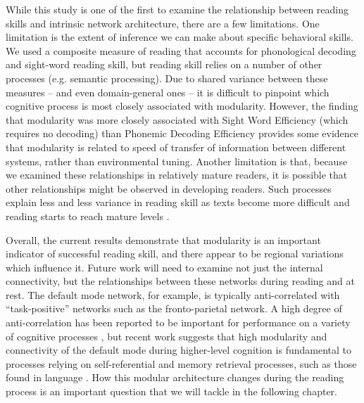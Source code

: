 While this study is one of the first to examine the relationship between reading skills and intrinsic network architecture, there are a few limitations. One limitation is the extent of inference we can make about specific behavioral skills. We used a composite measure of reading that accounts for phonological decoding and sight-word reading skill, but reading skill relies on a number of other processes (e.g. semantic processing). Due to shared variance between these measures -- and even domain-general ones -- it is difficult to pinpoint which cognitive process is most closely associated with modularity. However, the finding that modularity was more closely associated with Sight Word Efficiency (which requires no decoding) than Phonemic Decoding Efficiency provides some evidence that modularity is related to speed of transfer of information between different systems, rather than environmental tuning. Another limitation is that, because we examined these relationships in relatively mature readers, it is possible that other relationships might be observed in developing readers. Such processes explain less and less variance in reading skill as texts become more difficult and reading starts to reach mature levels \citep{Cutting2006a}. 

Overall, the current results demonstrate that modularity is an important indicator of successful reading skill, and there appear to be regional variations which influence it. Future work will need to examine not just the internal connectivity, but the relationships between these networks during reading and at rest. The default mode network, for example, is typically anti-correlated with ``task-positive'' networks such as the fronto-parietal network. A high degree of anti-correlation has been reported to be important for performance on a variety of cognitive processes \citep{Fox2005, Keller2015}, but recent work suggests that high modularity and connectivity of the default mode during higher-level cognition is fundamental to processes relying on self-referential and memory retrieval processes, such as those found in language \citep{Vatansever2015}. How this modular architecture changes during the reading process is an important question that we will tackle in the following chapter. 
